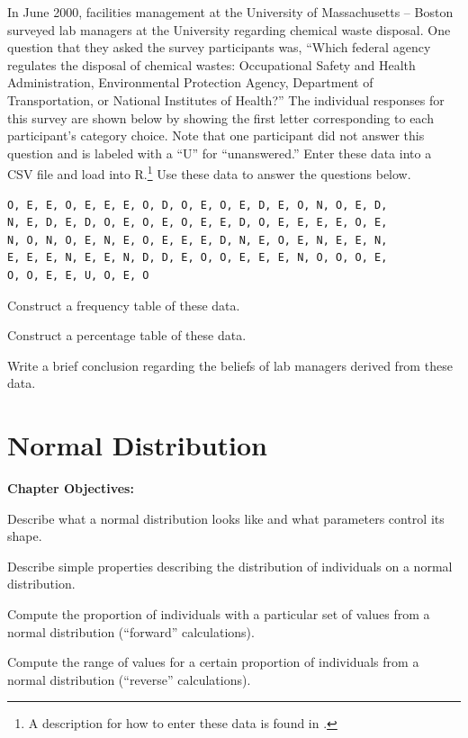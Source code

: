 \documentclass[10pt,openany]{book}\usepackage[]{graphicx}\usepackage[]{color}
\begin{document}
\begin{hwsection}
  \item \label{hwprob:cuEDA} \rhw{} In June 2000, facilities management at the University of Massachusetts -- Boston surveyed lab managers at the University regarding chemical waste disposal.  One question that they asked the survey participants was, ``Which federal agency regulates the disposal of chemical wastes: Occupational Safety and Health Administration, Environmental Protection Agency, Department of Transportation, or National Institutes of Health?''  The individual responses for this survey are shown below by showing the first letter corresponding to each participant's category choice.  Note that one participant did not answer this question and is labeled with a ``U'' for ``unanswered.''  Enter these data into a CSV file and load into R.\footnote{A description for how to enter these data is found in .}  Use these data to answer the questions below.
  \begin{Verbatim}
O, E, E, O, E, E, E, O, D, O, E, O, E, D, E, O, N, O, E, D,
N, E, D, E, D, O, E, O, E, O, E, E, D, O, E, E, E, E, O, E,
N, O, N, O, E, N, E, O, E, E, E, D, N, E, O, E, N, E, E, N,
E, E, E, N, E, E, N, D, D, E, O, O, E, E, E, N, O, O, O, E,
O, O, E, E, U, O, E, O
  \end{Verbatim}

  \begin{Enumerate}
    \item Construct a frequency table of these data.
    \item Construct a percentage table of these data.
    \item Write a brief conclusion regarding the beliefs of lab managers derived from these data.
  \end{Enumerate}
\end{hwsection}



\chapter{Normal Distribution}  \label{chap:NormDist}
\begin{ChapObj}{\boxwidth}
  \textbf{Chapter Objectives:}
  \begin{Enumerate}
    \item Describe what a normal distribution looks like and what parameters control its shape.
    \item Describe simple properties describing the distribution of individuals on a normal distribution.
    \item Compute the proportion of individuals with a particular set of values from a normal distribution (``forward'' calculations).
    \item Compute the range of values for a certain proportion of individuals from a normal distribution (``reverse'' calculations).
  \end{Enumerate}
\end{ChapObj}
\end{document}
